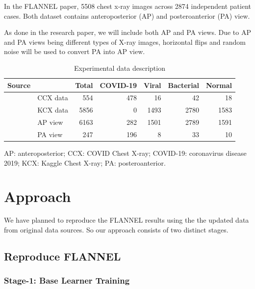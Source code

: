 \documentclass{sigkddExp}
\begin{document}
In the FLANNEL paper, 5508 chest x-ray images across 2874 independent patient
cases. Both dataset contains anteroposterior (AP) and posteroanterior (PA) view.

As done in the research paper, we will include  both AP and PA views. Due to AP
and PA views being different types of X-ray images, horizontal flips and random
noise will be used to convert PA into AP view. 

\begin{table}
    \centering
    \caption{Experimental data description}
    \begin{tabular}{llrrrrr} \hline
    Source& &Total&COVID-19&Viral&Bacterial&Normal\\ \hline
    \multirow{2}{*}{} Original data&CCX data&554&478&16&42&18\\
                      &KCX data&5856&0&1493&2780&1583\\ \hline
    \multirow{2}{*}{} View Distribution&AP view&6163&282&1501&2789&1591\\
                      &PA view&247&196&8&33&10\\ \hline
\end{tabular}\par
\bigskip
AP: anteroposterior; CCX: COVID Chest X-ray; COVID-19: coronavirus disease 2019;
KCX: Kaggle Chest X-ray; PA: posteroanterior.
\end{table}


\section{Approach}

We have planned to reproduce the FLANNEL results using the the updated data
from original data sources. So our approach consists of two distinct stages.

\subsection{Reproduce FLANNEL}

\subsubsection{Stage-1: Base Learner Training}
\end{document}
